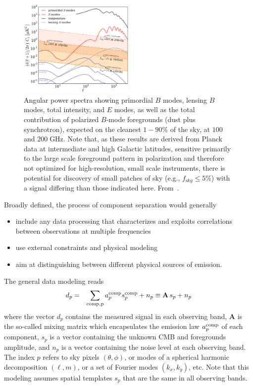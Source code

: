 \begin{figure}[htbp]
\centering
\includegraphics[width=0.5\textwidth]{Analysis/Power_Spectrum_figure_showing_foregrounds.pdf}
\caption{Angular power spectra showing primordial $B$ modes, lensing $B$ modes, total intensity, and $E$ modes, as well as the total contribution of polarized $B$-mode foregrounds (dust plus synchrotron), expected on the cleanest $1-90\%$ of the sky, at $100$ and $200\;$GHz. Note that, as these results are derived from Planck data at intermediate and high Galactic latitudes, sensitive primarily to the large scale 
foreground pattern in polarization and therefore not optimized for high-resolution, small scale instruments, there is potential for discovery of small patches of sky (e.g., $f_{\mathrm sky} \leq 5\%$) with a signal differing than those indicated here. From~\cite{Errard:2015cxa}.}
\label{fig:power_spectrum_fgs}
\end{figure}

Broadly defined, the process of component separation would generally
\begin{itemize}
	\item include any data processing that characterizes and exploits correlations between observations at multiple frequencies
	\item use external constraints and physical modeling
	\item aim at distinguishing between different physical sources of emission.
\end{itemize}

The general data modeling reads
\begin{eqnarray}
	\centering	
		d_p &=& \sum_{\rm comp, p} a_p^{\rm comp} s^{\rm comp}_p + n_p \equiv \mathbf{A}\,s_p + n_p
	\label{eq:comp_sep_data_modeling}
\end{eqnarray}
where the vector $d_p$ contains the measured signal in each observing band, $\mathbf{A}$ is the so-called mixing matrix which encapsulates the emission law $a_p^{\rm comp}$ of each component, $s_p$ is a vector containing the unknown CMB and foregrounds amplitude, and $n_p$ is a vector containing the noise level at each observing band. The index $p$ refers to sky pixels $\left( \theta, \phi \right)$, or modes of a spherical harmonic decomposition $\left( \ell, m\right)$, or a set of Fourier modes $\left(k_x,k_y\right)$, etc. Note that this modeling assumes spatial templates $s_p$ that are the same in all observing bands.

